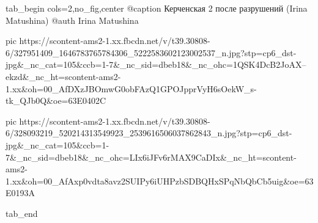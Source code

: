  
 
 
 
 

\begin{center}
\begin{minipage}{\textwidth}

\ifcmt
  tab_begin cols=2,no_fig,center
     @caption Керченская 2 после разрушений (Irina Matushina)
     @auth Irina Matushina

     pic https://scontent-ams2-1.xx.fbcdn.net/v/t39.30808-6/327951409_1646783765784306_5222583602123002537_n.jpg?stp=cp6_dst-jpg&_nc_cat=105&ccb=1-7&_nc_sid=dbeb18&_nc_ohc=1QSK4DcB2JoAX--ekzd&_nc_ht=scontent-ams2-1.xx&oh=00_AfDXzJBOmwG0obFAzQ1GPOJpprVyH6sOekW_s-tk_QJb0Q&oe=63E0402C

     pic https://scontent-ams2-1.xx.fbcdn.net/v/t39.30808-6/328093219_520214313549923_2539616506037862843_n.jpg?stp=cp6_dst-jpg&_nc_cat=105&ccb=1-7&_nc_sid=dbeb18&_nc_ohc=LIx6iJFv6rMAX9CaDIx&_nc_ht=scontent-ams2-1.xx&oh=00_AfAxp0vdta8avz2SUIPy6iUHPzbSDBQHxSPqNbQbCb5uig&oe=63E0193A

  tab_end
\fi
\end{minipage}
\end{center}

